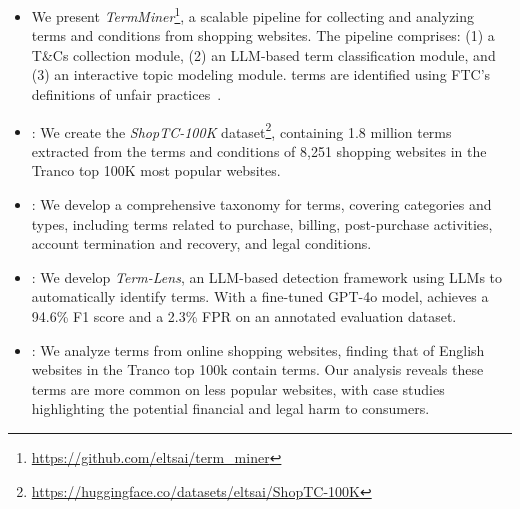 \begin{itemize} 
    \item {} We present \textit{TermMiner}\footnote{\url{https://github.com/eltsai/term_miner}}, a scalable pipeline for collecting and analyzing terms and conditions from shopping websites. The pipeline comprises: (1) a T\&Cs collection module, (2) an LLM-based term classification module, and (3) an interactive topic modeling module. \Termname terms are identified using FTC's definitions of unfair practices~\citep{ftcact}.
    
    \item {}: We create the \textit{ShopTC-100K} dataset\footnote{\url{https://huggingface.co/datasets/eltsai/ShopTC-100K}}, containing 1.8 million terms extracted from the terms and conditions of 8,251 shopping websites in the Tranco top 100K most popular websites.
    
    \item {}: We develop a comprehensive taxonomy for \termname terms, covering \termcatcnt categories and \termtypecnt types, including terms related to purchase, billing, post-purchase activities, account termination and recovery, and legal conditions.
    
    \item {}: We develop \textit{Term-Lens}, an LLM-based detection framework using LLMs to automatically identify \termname terms. With a fine-tuned GPT-4o model, \platform achieves a 94.6\% F1 score and a 2.3\% FPR on an annotated evaluation dataset. 
    
    \item {}: We analyze \termcnt terms from \websitecnt online shopping websites, finding that \websitepct of English websites in the Tranco top 100k contain \termname terms. Our analysis reveals these terms are more common on less popular websites, with case studies highlighting the potential financial and legal harm to consumers. 
\end{itemize}






